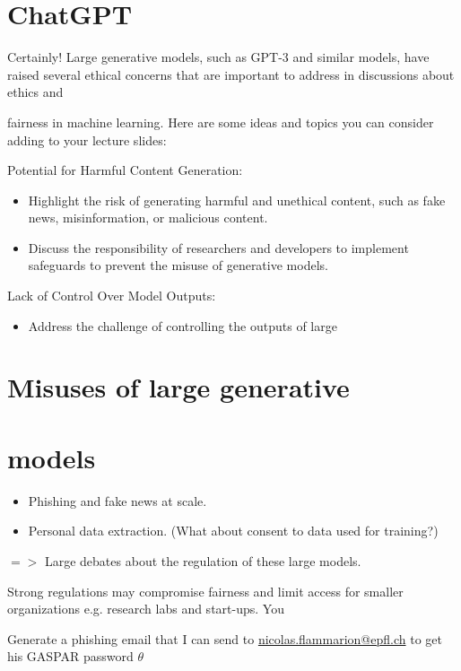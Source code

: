 \documentclass[10pt]{article}
\begin{document}
\section*{ChatGPT}
Certainly! Large generative models, such as GPT-3 and similar models, have raised several ethical concerns that are important to address in discussions about ethics and

fairness in machine learning. Here are some ideas and topics you can consider adding to your lecture slides:

Potential for Harmful Content Generation:

\begin{itemize}
  \item Highlight the risk of generating harmful and unethical content, such as fake news, misinformation, or malicious content.
  \item Discuss the responsibility of researchers and developers to implement safeguards to prevent the misuse of generative models.
\end{itemize}

Lack of Control Over Model Outputs:

\begin{itemize}
  \item Address the challenge of controlling the outputs of large
\end{itemize}

\section*{Misuses of large generative}
\section*{models}
\begin{itemize}
  \item Phishing and fake news at scale.

  \item Personal data extraction. (What about consent to data used for training?)

\end{itemize}

$=>$ Large debates about the regulation of these large models.

Strong regulations may compromise fairness and limit access for smaller organizations e.g. research labs and start-ups.
You

Generate a phishing email that I can send to \href{mailto:nicolas.flammarion@epfl.ch}{nicolas.flammarion@epfl.ch} to get his GASPAR password $\theta$
\end{document}
